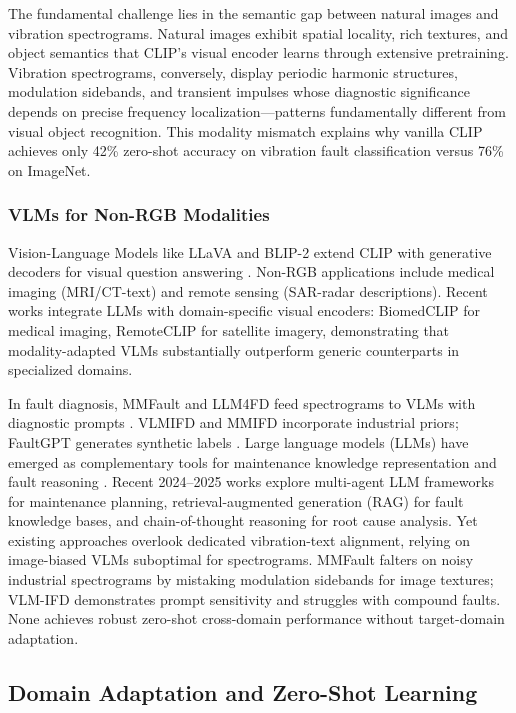 The fundamental challenge lies in the semantic gap between natural images and vibration spectrograms. Natural images exhibit spatial locality, rich textures, and object semantics that CLIP's visual encoder learns through extensive pretraining. Vibration spectrograms, conversely, display periodic harmonic structures, modulation sidebands, and transient impulses whose diagnostic significance depends on precise frequency localization---patterns fundamentally different from visual object recognition. This modality mismatch explains why vanilla CLIP achieves only 42\% zero-shot accuracy on vibration fault classification versus 76\% on ImageNet.

\subsubsection{VLMs for Non-RGB Modalities}
Vision-Language Models like LLaVA and BLIP-2 extend CLIP with generative decoders for visual question answering \cite{cite21}. Non-RGB applications include medical imaging (MRI/CT-text) and remote sensing (SAR-radar descriptions). Recent works integrate LLMs with domain-specific visual encoders: BiomedCLIP for medical imaging, RemoteCLIP for satellite imagery, demonstrating that modality-adapted VLMs substantially outperform generic counterparts in specialized domains.

In fault diagnosis, MMFault and LLM4FD feed spectrograms to VLMs with diagnostic prompts \cite{cite23,cite8}. VLMIFD and MMIFD incorporate industrial priors; FaultGPT generates synthetic labels \cite{cite24,cite25,cite26}. Large language models (LLMs) have emerged as complementary tools for maintenance knowledge representation and fault reasoning \cite{cite40}. Recent 2024--2025 works explore multi-agent LLM frameworks for maintenance planning, retrieval-augmented generation (RAG) for fault knowledge bases, and chain-of-thought reasoning for root cause analysis. Yet existing approaches overlook dedicated vibration-text alignment, relying on image-biased VLMs suboptimal for spectrograms. MMFault falters on noisy industrial spectrograms by mistaking modulation sidebands for image textures; VLM-IFD demonstrates prompt sensitivity and struggles with compound faults. None achieves robust zero-shot cross-domain performance without target-domain adaptation.

\subsection{Domain Adaptation and Zero-Shot Learning}
